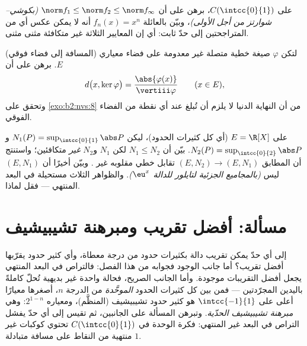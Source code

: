 \begin{exercise}[$\star\star$]\label{exo:b2:nvs:10}
على $C(\intcc{0}{1})$، برهن على أن $\norm f_1 \leq \norm f_2 \leq \norm
f_\infty$ \emph{(بكوشي--شوارتز من أجل الأولى)}، وبيّن بالعائلة
$f_n(x) = x^n$ أنه لا يمكن عكس أي من المتراجحتين
إلى حدّ ثابت: أي إن المعايير الثلاثة غير متكافئة مثنى مثنى.
\end{exercise}

\begin{exercise}[$\star\star$]\label{exo:b2:nvs:11}
(المسافة إلى فضاء فوقي) لتكن $\varphi$ صيغة خطية متصلة غير
معدومة على فضاء معياري $E$. برهن على أن
\[
d\bigl(x, \ker\varphi\bigr) =
\frac{\abs{\varphi(x)}}{\vertiii\varphi}
\qquad (x \in E),
\]
وتحقق على \cref{exo:b2:nvs:8} من أن النهاية الدنيا لا يلزم أن
تُبلغ عند أي نقطة من الفضاء الفوقي.
\end{exercise}

\begin{exercise}[$\star\star\star$]\label{exo:b2:nvs:12}
على $E = \R[X]$ (أي كل كثيرات الحدود)، ليكن $N_1(P) =
\sup_{\intcc{0}{1}}\abs P$ و$N_2(P) =
\sup_{\intcc{0}{2}}\abs P$. بيّن أن $N_1 \leq N_2$ لكن
$N_1$ و$N_2$ \emph{غير} متكافئين؛ واستنتج أن
المطابق $(E, N_2) \to (E, N_1)$ تقابل خطي 
مقلوبه غير . وبيّن أخيرًا أن $(E, N_1)$
ليس  \emph{(بالمجاميع الجزئية لتايلور للدالة $\eu^x$)}. والظواهر الثلاث
مستحيلة في البعد المنتهي --- فقل لماذا.
\end{exercise}

\section{مسألة: أفضل تقريب ومبرهنة تشيبيشيف}

إلى أي حدّ يمكن تقريب دالة بكثيرات حدود من درجة معطاة،
وأي كثير حدود يقرّبها أفضل تقريب؟ أما جانب الوجود
فجوابه من هذا الفصل: فالتراص في البعد المنتهي
يجعل أفضل التقريبات موجودة. وأما الجانب الصريح،
فحالة واحدة غير بديهية تُحلّ كاملةً باليدين المجرّدتين ---
فمن بين كل كثيرات الحدود \emph{الموحَّدة} من الدرجة $n$، أصغرها
معيارًا أعلى على $\intcc{-1}{1}$ هو كثير حدود تشيبيشيف (المنظَّم)،
ومعياره $2^{1-n}$: وهي \emph{مبرهنة تشيبيشيف
الحدّية}. وتبرهن المسألة على الجانبين، ثم تقيس إلى أي حدّ
يفشل التراص في البعد غير المنتهي: فكرة الوحدة في
$C(\intcc{0}{1})$ تحتوي كوكبات غير منتهية من النقاط على
مسافة متبادلة $1$.

